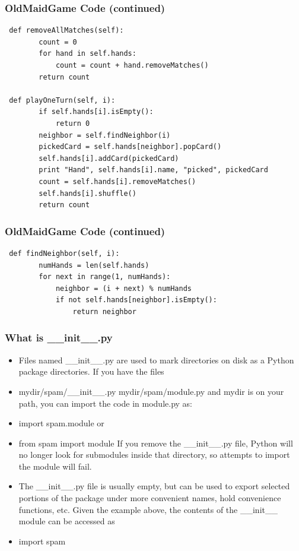 \documentclass{beamer}
\newcommand\Fontix{\fontsize{9}{8.3}\selectfont}
\begin{document}
\begin{frame}[fragile]
\frametitle{OldMaidGame Code (continued)}
\Fontix
\begin{lstlisting}
 def removeAllMatches(self):
        count = 0
        for hand in self.hands:
            count = count + hand.removeMatches()
        return count
   
 def playOneTurn(self, i):
        if self.hands[i].isEmpty():
            return 0
        neighbor = self.findNeighbor(i)
        pickedCard = self.hands[neighbor].popCard()
        self.hands[i].addCard(pickedCard)
        print "Hand", self.hands[i].name, "picked", pickedCard
        count = self.hands[i].removeMatches()
        self.hands[i].shuffle()
        return count
\end{lstlisting}
\end{frame}

\begin{frame}[fragile]
\frametitle{OldMaidGame Code (continued)}
\begin{lstlisting}
 def findNeighbor(self, i):
        numHands = len(self.hands)
        for next in range(1, numHands):
            neighbor = (i + next) % numHands
            if not self.hands[neighbor].isEmpty():
                return neighbor

\end{lstlisting}
\end{frame}

\begin{frame}[fragile]
\frametitle{What is \_\_init\_\_.py}
\begin{itemize}
\item Files named \_\_init\_\_.py are used to mark directories on disk as a Python package directories. If you have the files
\item mydir/spam/\_\_init\_\_.py mydir/spam/module.py and mydir is on your path, you can import the code in module.py as:
\item import spam.module or
\item from spam import module If you remove the \_\_init\_\_.py file, Python will no longer look for submodules inside that directory, so attempts to import the module will fail.
\item The \_\_init\_\_.py file is usually empty, but can be used to export selected portions of the package under more convenient names, hold convenience functions, etc. Given the example above, the contents of the \_\_init\_\_ module can be accessed as
\item import spam
\end{itemize} 
\end{frame}
\end{document}
